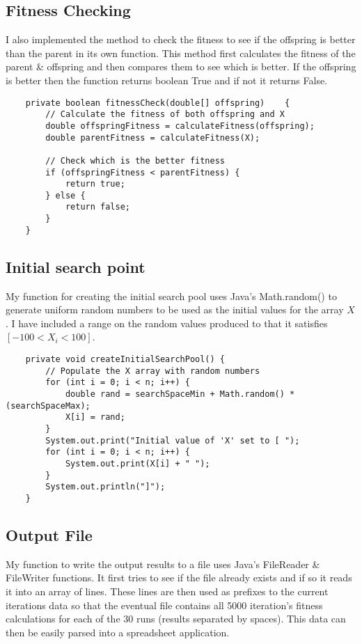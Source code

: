 \documentclass{article}
\begin{document}
    \subsection{Fitness Checking}
    I also implemented the method to check the fitness to see if the offspring is better than the parent in its own function. This method first calculates the fitness of the parent \& offspring and then compares them to see which is better. If the offspring is better then the function returns boolean True and if not it returns False.
    \begin{lstlisting}
    private boolean fitnessCheck(double[] offspring) 	{
		// Calculate the fitness of both offspring and X
		double offspringFitness = calculateFitness(offspring);
		double parentFitness = calculateFitness(X);

		// Check which is the better fitness
		if (offspringFitness < parentFitness) {
			return true;
		} else {
			return false;
		}
	}
    \end{lstlisting}
    
    \subsection{Initial search point}
    My function for creating the initial search pool uses Java's Math.random() to generate uniform random numbers to be used as the initial values for the array $X$. I have included a range on the random values produced to that it satisfies $[-100 < X_i < 100]$.
    \begin{lstlisting}
    private void createInitialSearchPool() {
		// Populate the X array with random numbers
		for (int i = 0; i < n; i++) {
			double rand = searchSpaceMin + Math.random() * (searchSpaceMax);
			X[i] = rand;
		}
		System.out.print("Initial value of 'X' set to [ ");
		for (int i = 0; i < n; i++) {
			System.out.print(X[i] + " ");
		}
		System.out.println("]");
	}
	\end{lstlisting}
	
	\subsection{Output File}
	My function to write the output results to a file uses Java's FileReader \& FileWriter functions. It first tries to see if the file already exists and if so it reads it into an array of lines. These lines are then used as prefixes to the current iterations data so that the eventual file contains all 5000 iteration's fitness calculations for each of the 30 runs (results separated by spaces). This data can then be easily parsed into a spreadsheet application.
	
\end{document}
